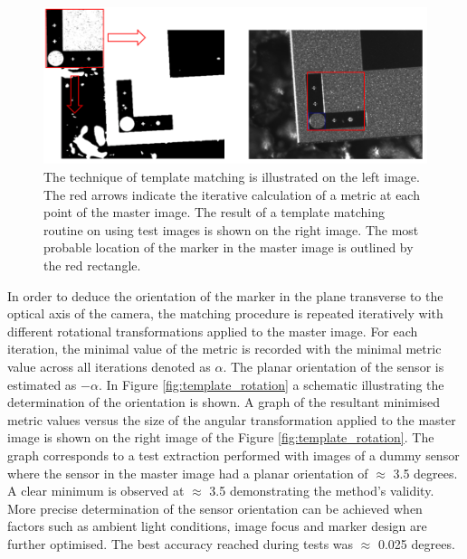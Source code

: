 \begin{figure}[ht]\centering
\includegraphics[width=0.9\linewidth]{Data/Control_Software/Template_matching.png}
\caption{The technique of template matching is illustrated on the left image. The red arrows indicate the iterative calculation of a metric at each point of the master image. The result of a template matching routine on using test images is shown on the right image. The most probable location of the marker in the master image is outlined by the red rectangle.}
\label{fig:template_matching}
\end{figure}

In order to deduce the orientation of the marker in the plane transverse to the optical axis of the camera, the matching procedure is repeated iteratively with different rotational transformations applied to the master image. For each iteration, the minimal value of the metric is recorded with the minimal metric value across all iterations denoted as $\alpha$. The planar orientation of the sensor is estimated as $-\alpha$. In Figure \ref{fig:template_rotation} a schematic illustrating the determination of the orientation is shown. A graph of the resultant minimised metric values versus the size of the angular transformation applied to the master image is shown on the right image of the Figure \ref{fig:template_rotation}. The graph corresponds to a test extraction performed with images of a dummy sensor where the sensor in the master image had a planar orientation of $\approx$ 3.5 degrees. A clear minimum is observed at $\approx$ 3.5 demonstrating the method's validity. More precise determination of the sensor orientation can be achieved when factors such as ambient light conditions, image focus and marker design are further optimised. The best accuracy reached during tests was $\approx$ 0.025 degrees.


